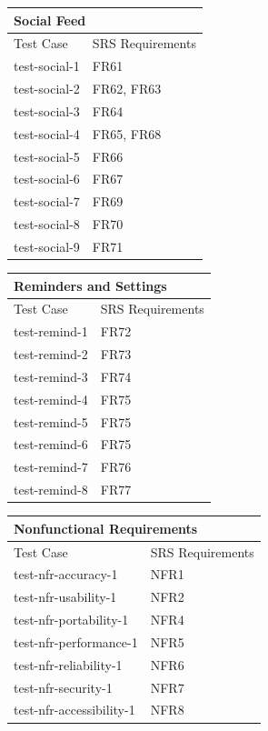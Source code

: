 \documentclass[12pt, titlepage]{article}
\begin{document}
\begin{center}
\begin{tabular}{p{} p{}}
\hline
\multicolumn{2}{l}{Social Feed} \\
\hline
Test Case & SRS Requirements \\
\hline
test-social-1 & FR61 \\
test-social-2 & FR62, FR63 \\
test-social-3 & FR64 \\
test-social-4 & FR65, FR68 \\
test-social-5 & FR66 \\
test-social-6 & FR67 \\
test-social-7 & FR69 \\
test-social-8 & FR70 \\
test-social-9 & FR71 \\
\hline
\end{tabular}
\end{center}

\begin{center}
\begin{tabular}{p{} p{}}
\hline
\multicolumn{2}{l}{Reminders and Settings} \\
\hline
Test Case & SRS Requirements \\
\hline
test-remind-1 & FR72 \\
test-remind-2 & FR73 \\
test-remind-3 & FR74 \\
test-remind-4 & FR75 \\
test-remind-5 & FR75 \\
test-remind-6 & FR75 \\
test-remind-7 & FR76 \\
test-remind-8 & FR77 \\
\hline
\end{tabular}
\end{center}

\begin{center}
\begin{tabular}{p{} p{}}
\hline
\multicolumn{2}{l}{Nonfunctional Requirements} \\
\hline
Test Case & SRS Requirements \\
\hline
test-nfr-accuracy-1 & NFR1 \\
test-nfr-usability-1 & NFR2 \\
test-nfr-portability-1 & NFR4 \\
test-nfr-performance-1 & NFR5 \\
test-nfr-reliability-1 & NFR6 \\
test-nfr-security-1 & NFR7 \\
test-nfr-accessibility-1 & NFR8 \\
\hline
\end{tabular}
\end{center}
\end{document}
